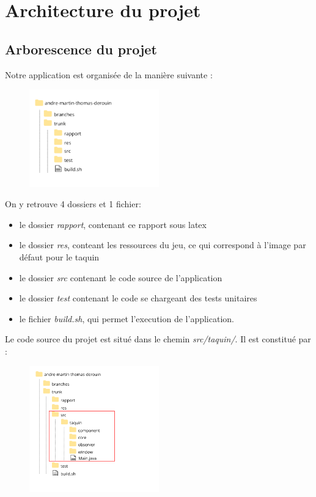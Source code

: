 \chapter{Architecture du projet}

	\section{Arborescence du projet}

		Notre application est organisée de la manière suivante :


		\begin{figure}[H]
			\centering
			\includegraphics[width=0.5\textwidth, keepaspectratio]{img/racine.png}
		\end{figure}

		On y retrouve 4 dossiers et 1 fichier:

		\begin{itemize}
			\item le dossier \textit{rapport}, contenant ce rapport sous latex
			\item le dossier \textit{res}, conteant les ressources du jeu, ce qui correspond à l’image par défaut pour le taquin
			\item le dossier \textit{src} contenant le code source de l’application
			\item le dossier \textit{test} contenant le code se chargeant des tests unitaires
			\item le fichier \textit{build.sh}, qui permet l’execution de l’application.
		\end{itemize}

		Le code source du projet est situé dans le chemin \textit{src/taquin/}. Il est constitué par :

		\begin{figure}[H]
			\centering
			\includegraphics[width=0.5\textwidth, keepaspectratio]{img/detail.png}
		\end{figure}

